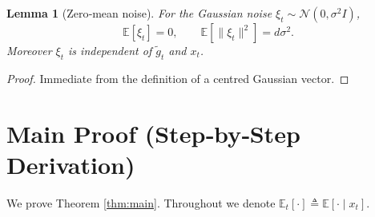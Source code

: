 \documentclass[11pt]{article}
\newtheorem{lemma}{Lemma}
\newcommand{\E}{\mathbb{E}}
\begin{document}
\begin{lemma}[Zero‑mean noise]\label{lem:noise}
For the Gaussian noise $\xi_t\sim\mathcal N(0,\sigma^{2}I)$,
\[
\E[\xi_t]=0,\qquad \E[\|\xi_t\|^{2}]=d\sigma^{2}.
\]
Moreover $\xi_t$ is independent of $\tilde g_t$ and $x_t$.
\end{lemma}
\begin{proof}
Immediate from the definition of a centred Gaussian vector.
\end{proof}

\section*{Main Proof (Step‑by‑Step Derivation)}
We prove Theorem \ref{thm:main}. Throughout we denote $\E_t[\cdot]\triangleq\E[\cdot\mid x_t]$.
\end{document}
